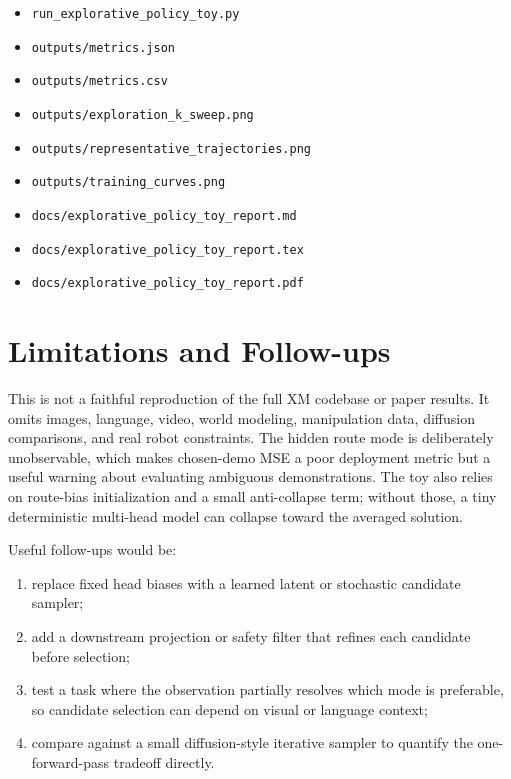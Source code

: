 \documentclass[11pt]{article}
\begin{document}
\begin{itemize}[leftmargin=1.5em]
  \item \texttt{run\_explorative\_policy\_toy.py}
  \item \texttt{outputs/metrics.json}
  \item \texttt{outputs/metrics.csv}
  \item \texttt{outputs/exploration\_k\_sweep.png}
  \item \texttt{outputs/representative\_trajectories.png}
  \item \texttt{outputs/training\_curves.png}
  \item \texttt{docs/explorative\_policy\_toy\_report.md}
  \item \texttt{docs/explorative\_policy\_toy\_report.tex}
  \item \texttt{docs/explorative\_policy\_toy\_report.pdf}
\end{itemize}

\section{Limitations and Follow-ups}

This is not a faithful reproduction of the full XM codebase or paper results. It omits images, language, video, world modeling, manipulation data, diffusion comparisons, and real robot constraints. The hidden route mode is deliberately unobservable, which makes chosen-demo MSE a poor deployment metric but a useful warning about evaluating ambiguous demonstrations. The toy also relies on route-bias initialization and a small anti-collapse term; without those, a tiny deterministic multi-head model can collapse toward the averaged solution.

Useful follow-ups would be:
\begin{enumerate}[leftmargin=1.5em]
  \item replace fixed head biases with a learned latent or stochastic candidate sampler;
  \item add a downstream projection or safety filter that refines each candidate before selection;
  \item test a task where the observation partially resolves which mode is preferable, so candidate selection can depend on visual or language context;
  \item compare against a small diffusion-style iterative sampler to quantify the one-forward-pass tradeoff directly.
\end{enumerate}
\end{document}
